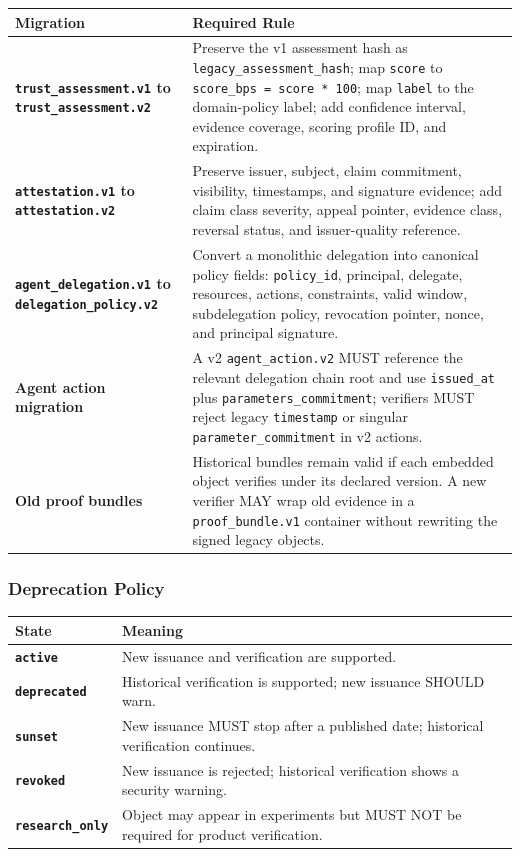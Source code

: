 \documentclass[11pt]{article}
\begin{document}
\begin{center}
\begin{tabularx}{\textwidth}{>{\bfseries}p{} X}
\toprule
Migration & Required Rule \\
\midrule
\texttt{trust\_assessment.v1} to \texttt{trust\_assessment.v2} & Preserve the v1 assessment hash as \texttt{legacy\_assessment\_hash}; map \texttt{score} to \texttt{score\_bps = score * 100}; map \texttt{label} to the domain-policy label; add confidence interval, evidence coverage, scoring profile ID, and expiration. \\
\texttt{attestation.v1} to \texttt{attestation.v2} & Preserve issuer, subject, claim commitment, visibility, timestamps, and signature evidence; add claim class severity, appeal pointer, evidence class, reversal status, and issuer-quality reference. \\
\texttt{agent\_delegation.v1} to \texttt{delegation\_policy.v2} & Convert a monolithic delegation into canonical policy fields: \texttt{policy\_id}, principal, delegate, resources, actions, constraints, valid window, subdelegation policy, revocation pointer, nonce, and principal signature. \\
Agent action migration & A v2 \texttt{agent\_action.v2} MUST reference the relevant delegation chain root and use \texttt{issued\_at} plus \texttt{parameters\_commitment}; verifiers MUST reject legacy \texttt{timestamp} or singular \texttt{parameter\_commitment} in v2 actions. \\
Old proof bundles & Historical bundles remain valid if each embedded object verifies under its declared version. A new verifier MAY wrap old evidence in a \texttt{proof\_bundle.v1} container without rewriting the signed legacy objects. \\
\bottomrule
\end{tabularx}
\end{center}

\subsubsection{Deprecation Policy}

\begin{center}
\begin{tabularx}{\textwidth}{>{\bfseries}p{} X}
\toprule
State & Meaning \\
\midrule
\texttt{active} & New issuance and verification are supported. \\
\texttt{deprecated} & Historical verification is supported; new issuance SHOULD warn. \\
\texttt{sunset} & New issuance MUST stop after a published date; historical verification continues. \\
\texttt{revoked} & New issuance is rejected; historical verification shows a security warning. \\
\texttt{research\_only} & Object may appear in experiments but MUST NOT be required for product verification. \\
\bottomrule
\end{tabularx}
\end{center}
\end{document}
